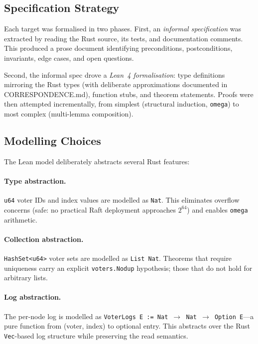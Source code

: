 \documentclass[sigconf,10pt]{acmart}
\begin{document}
\subsection{Specification Strategy}

Each target was formalised in two phases.  First, an \emph{informal
specification} was extracted by reading the Rust source, its tests, and
documentation comments.  This produced a prose document identifying
preconditions, postconditions, invariants, edge cases, and open questions.

Second, the informal spec drove a \emph{Lean~4 formalisation}: type
definitions mirroring the Rust types (with deliberate approximations
documented in CORRESPONDENCE.md), function stubs, and theorem statements.
Proofs were then attempted incrementally, from simplest (structural
induction, \texttt{omega}) to most complex (multi-lemma composition).

\subsection{Modelling Choices}
\label{sec:modelling}

The Lean model deliberately abstracts several Rust features:

\paragraph{Type abstraction.} \texttt{u64} voter IDs and index values
are modelled as \texttt{Nat}.  This eliminates overflow concerns (safe: no
practical Raft deployment approaches $2^{64}$) and enables \texttt{omega}
arithmetic.

\paragraph{Collection abstraction.} \texttt{HashSet<u64>} voter sets are
modelled as \texttt{List Nat}.  Theorems that require uniqueness carry an
explicit \texttt{voters.Nodup} hypothesis; those that do not hold for
arbitrary lists.

\paragraph{Log abstraction.} The per-node log is modelled as
\texttt{VoterLogs E := Nat $\to$ Nat $\to$ Option E}---a pure function
from (voter, index) to optional entry.  This abstracts over the Rust
\texttt{Vec}-based log structure while preserving the read semantics.
\end{document}
